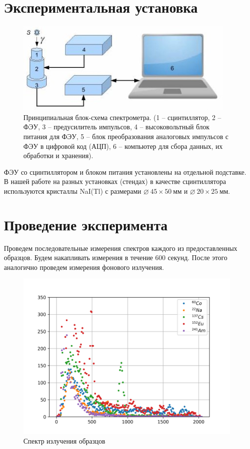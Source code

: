 \documentclass[14pt, a4paper]{report}
\begin{document}
\section{Экспериментальная установка}

\begin{figure}[H]
\centering
\includegraphics[width=.7\textwidth]{../images/555-1}
\caption{Принципиальная блок-схема спектрометра. (1 -- сцинтиллятор, 2 -- ФЭУ, 3 -- предусилитель импульсов, 4 -- высоковольтный блок питания для ФЭУ, 5 -- блок преобразования аналоговых импульсов с ФЭУ в цифровой код (АЦП), 6 -- компьютер для сбора данных, их обработки и хранения).}
\end{figure}

ФЭУ со сцинтиллятором и блоком питания установлены на отдельной подставке. В нашей работе на разных установках (стендах) в качестве сцинтиллятора используются кристаллы NaI(Tl) с размерами $\diameter\ 45\times50\ мм$ и $\diameter\ 20\times25\ мм$.

\section{Проведение эксперимента}

Проведем последовательные измерения спектров каждого из предоставленных образцов. Будем накапливать измерения в течение 600 секунд. После этого аналогично проведем измерения фонового излучения.

\begin{figure}[H]
\centering
\includegraphics[width=.7\textwidth]{../images/555-common}
\caption{Спектр излучения образцов}
\end{figure}
\end{document}
